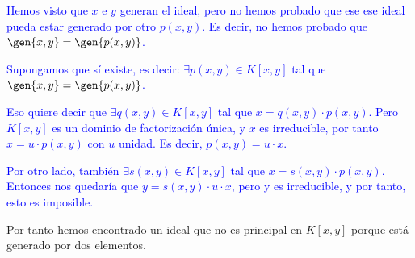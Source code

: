 \begin{problem}
\textcolor{blue}{
Hemos visto que $x$ e $y$ generan el ideal, pero no hemos probado que ese ese ideal pueda estar generado por otro $p(x,y)$. Es decir, no hemos probado que $\gen{x,y}=\gen{p(x,y)}$.
}

\textcolor{blue}{
Supongamos que sí existe, es decir: $\exists p(x,y) \in K[x,y]$ tal que $\gen{x,y}=\gen{p(x,y)}$.
}

\textcolor{blue}{
Eso quiere decir que $\exists  q(x,y) \in K[x,y]$ tal que $x=q(x,y)\cdot p(x,y)$. Pero $K[x,y]$ es un dominio de factorización única, y $x$ es irreducible, por tanto $x = u\cdot p(x,y)$ con $u$ unidad. Es decir, $p(x,y)=u\cdot x$.
}

\textcolor{blue}{
Por otro lado, también $\exists  s(x,y) \in K[x,y]$ tal que $x=s(x,y)\cdot p(x,y)$. Entonces nos quedaría que $y=s(x,y)\cdot u \cdot x$, pero y es irreducible, y por tanto, esto es imposible.
}

Por tanto hemos encontrado un ideal que no es principal en $K[x,y]$ porque está generado por dos elementos.
\end{problem}


